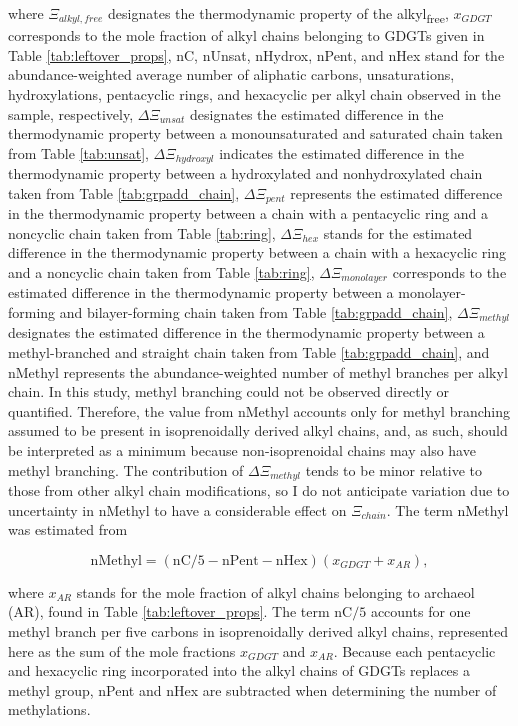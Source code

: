 \noindent where $\Xi_{alkyl, free}$ designates the thermodynamic property of the alkyl\textsubscript{free}, $x_{GDGT}$ corresponds to the mole fraction of alkyl chains belonging to GDGTs given in Table \ref{tab:leftover_props}, nC, nUnsat, nHydrox, nPent, and nHex stand for the abundance-weighted average number of aliphatic carbons, unsaturations, hydroxylations, pentacyclic rings, and hexacyclic per alkyl chain observed in the sample, respectively, $\Delta\Xi_{unsat}$ designates the estimated difference in the thermodynamic property between a monounsaturated and saturated chain taken from Table \ref{tab:unsat}, $\Delta\Xi_{hydroxyl}$ indicates the estimated difference in the thermodynamic property between a hydroxylated and nonhydroxylated chain taken from Table \ref{tab:grpadd_chain}, $\Delta\Xi_{pent}$ represents the estimated difference in the thermodynamic property between a chain with a pentacyclic ring and a noncyclic chain taken from Table \ref{tab:ring}, $\Delta\Xi_{hex}$ stands for the estimated difference in the thermodynamic property between a chain with a hexacyclic ring and a noncyclic chain taken from Table \ref{tab:ring}, $\Delta\Xi_{monolayer}$ corresponds to the estimated difference in the thermodynamic property between a monolayer-forming and bilayer-forming chain taken from Table \ref{tab:grpadd_chain}, $\Delta\Xi_{methyl}$ designates the estimated difference in the thermodynamic property between a methyl-branched and straight chain taken from Table \ref{tab:grpadd_chain}, and nMethyl represents the abundance-weighted number of methyl branches per alkyl chain. In this study, methyl branching could not be observed directly or quantified. Therefore, the value from nMethyl accounts only for methyl branching assumed to be present in isoprenoidally derived alkyl chains, and, as such, should be interpreted as a minimum because non-isoprenoidal chains may also have methyl branching. The contribution of $\Delta\Xi_{methyl}$ tends to be minor relative to those from other alkyl chain modifications, so I do not anticipate variation due to uncertainty in nMethyl to have a considerable effect on $\Xi_{chain}$. The term nMethyl was estimated from

\begin{equation}
\text{nMethyl} = (\text{nC}/5 - \text{nPent} - \text{nHex})(x_{GDGT} + x_{AR}),
\end{equation}

\noindent where $x_{AR}$ stands for the mole fraction of alkyl chains belonging to archaeol (AR), found in Table \ref{tab:leftover_props}. The term nC$/5$ accounts for one methyl branch per five carbons in isoprenoidally derived alkyl chains, represented here as the sum of the mole fractions $x_{GDGT}$ and $x_{AR}$. Because each pentacyclic and hexacyclic ring incorporated into the alkyl chains of GDGTs replaces a methyl group, nPent and nHex are subtracted when determining the number of methylations.


